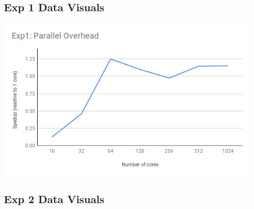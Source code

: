 \documentclass[]{article}
\begin{document}
	\subsection{Exp 1 Data Visuals}
		\includegraphics[scale=0.5]{graphs/exp1.png}
	
	\subsection{Exp 2 Data Visuals}
	
\end{document}
